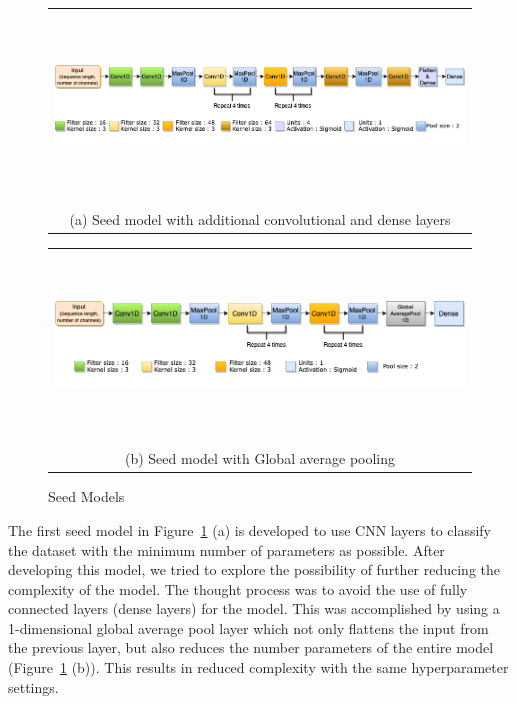 \begin{figure}[ht!]
\centering
    \begin{tabular}{@{}c@{}}
        \includegraphics[width=1.0\linewidth, height=5cm]{BachelorMasterThesis/DataExploration/Figures/Seed_model_2.png}  \\[\abovecaptionskip]
        \small (a) Seed model with additional convolutional and dense layers
    \end{tabular}
    
     \vspace{\floatsep}
    
    \begin{tabular}{@{}c@{}}
        \includegraphics[width=1.0\linewidth, height=5cm]{BachelorMasterThesis/DataExploration/Figures/Seed_model.png}  \\[\abovecaptionskip]
        \small (b) Seed model with Global average pooling
    \end{tabular}
    \caption{Seed Models}
    \label{fig:seed_model_1_n_2}
\end{figure}

The first seed model in Figure~\ref{fig:seed_model_1_n_2} (a) is developed to use CNN layers to classify the dataset with the minimum number of parameters as possible. After developing this model, we tried to explore the possibility of further reducing the complexity of the model. The thought process was to avoid the use of fully connected layers (dense layers) for the model. This was accomplished by using a 1-dimensional global average pool layer which not only flattens the input from the previous layer, but also reduces the number parameters of the entire model (Figure~\ref{fig:seed_model_1_n_2} (b)). This results in reduced complexity with the same hyperparameter settings.

